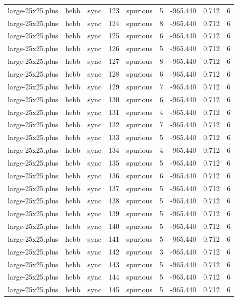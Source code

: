 \begin{tabular}{lllrlrrrr}
large-25x25.plus & hebb & sync & 123 & spurious & 5 & -965.440 & 0.712 & 6 \\
large-25x25.plus & hebb & sync & 124 & spurious & 8 & -965.440 & 0.712 & 6 \\
large-25x25.plus & hebb & sync & 125 & spurious & 6 & -965.440 & 0.712 & 6 \\
large-25x25.plus & hebb & sync & 126 & spurious & 5 & -965.440 & 0.712 & 6 \\
large-25x25.plus & hebb & sync & 127 & spurious & 8 & -965.440 & 0.712 & 6 \\
large-25x25.plus & hebb & sync & 128 & spurious & 6 & -965.440 & 0.712 & 6 \\
large-25x25.plus & hebb & sync & 129 & spurious & 7 & -965.440 & 0.712 & 6 \\
large-25x25.plus & hebb & sync & 130 & spurious & 6 & -965.440 & 0.712 & 6 \\
large-25x25.plus & hebb & sync & 131 & spurious & 4 & -965.440 & 0.712 & 6 \\
large-25x25.plus & hebb & sync & 132 & spurious & 7 & -965.440 & 0.712 & 6 \\
large-25x25.plus & hebb & sync & 133 & spurious & 5 & -965.440 & 0.712 & 6 \\
large-25x25.plus & hebb & sync & 134 & spurious & 4 & -965.440 & 0.712 & 6 \\
large-25x25.plus & hebb & sync & 135 & spurious & 5 & -965.440 & 0.712 & 6 \\
large-25x25.plus & hebb & sync & 136 & spurious & 6 & -965.440 & 0.712 & 6 \\
large-25x25.plus & hebb & sync & 137 & spurious & 5 & -965.440 & 0.712 & 6 \\
large-25x25.plus & hebb & sync & 138 & spurious & 5 & -965.440 & 0.712 & 6 \\
large-25x25.plus & hebb & sync & 139 & spurious & 5 & -965.440 & 0.712 & 6 \\
large-25x25.plus & hebb & sync & 140 & spurious & 5 & -965.440 & 0.712 & 6 \\
large-25x25.plus & hebb & sync & 141 & spurious & 5 & -965.440 & 0.712 & 6 \\
large-25x25.plus & hebb & sync & 142 & spurious & 3 & -965.440 & 0.712 & 6 \\
large-25x25.plus & hebb & sync & 143 & spurious & 5 & -965.440 & 0.712 & 6 \\
large-25x25.plus & hebb & sync & 144 & spurious & 5 & -965.440 & 0.712 & 6 \\
large-25x25.plus & hebb & sync & 145 & spurious & 5 & -965.440 & 0.712 & 6 \\

\end{tabular}
